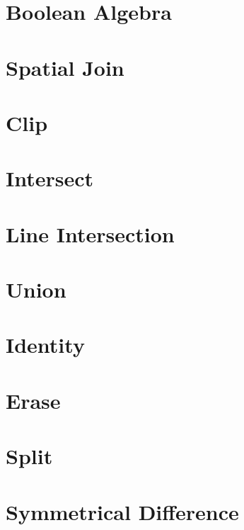 \documentclass[
]{book}
\begin{document}
\hypertarget{boolean-algebra-1}{%
\section{Boolean Algebra}\label{boolean-algebra-1}}

\hypertarget{spatial-join}{%
\section{Spatial Join}\label{spatial-join}}

\hypertarget{clip}{%
\section{Clip}\label{clip}}

\hypertarget{intersect}{%
\section{Intersect}\label{intersect}}

\hypertarget{line-intersection}{%
\section{Line Intersection}\label{line-intersection}}

\hypertarget{union}{%
\section{Union}\label{union}}

\hypertarget{identity}{%
\section{Identity}\label{identity}}

\hypertarget{erase}{%
\section{Erase}\label{erase}}

\hypertarget{split}{%
\section{Split}\label{split}}

\hypertarget{symmetrical-difference}{%
\section{Symmetrical Difference}\label{symmetrical-difference}}
\end{document}
